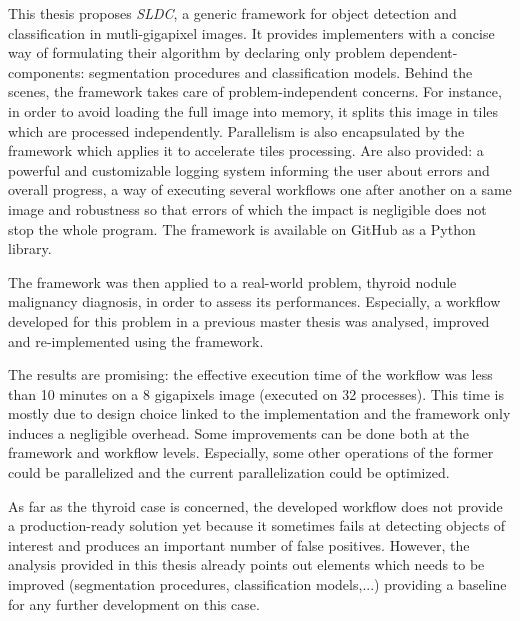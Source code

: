 This thesis proposes \textit{SLDC}, a generic framework for object detection and classification in mutli-gigapixel images. 
It provides implementers with a concise way of formulating their algorithm by declaring only problem dependent-components: segmentation procedures and classification models. Behind the scenes, the framework takes care of problem-independent concerns. For instance, in order to avoid loading the full image into memory, it splits this image in tiles which are processed independently. Parallelism is also encapsulated by the framework which applies it to accelerate tiles processing. Are also provided: a powerful and customizable logging system informing the user about errors and overall progress, a way of executing several workflows one after another on a same image and robustness so that errors of which the impact is negligible does not stop the whole program. The framework is available on GitHub as a Python library. 

The framework was then applied to a real-world problem, thyroid nodule malignancy diagnosis, in order to assess its performances. Especially, a workflow developed for this problem in a previous master thesis was analysed, improved and re-implemented using the framework. 

The results are promising: the effective execution time of the workflow was less than 10 minutes on a 8 gigapixels image (executed on 32 processes). This time is mostly due to design choice linked to the implementation and the framework only induces a negligible overhead. Some improvements can be done both at the framework and workflow levels. Especially, some other operations of the former could be parallelized and the current parallelization could be optimized.

As far as the thyroid case is concerned, the developed workflow does not provide a production-ready solution yet because it sometimes fails at detecting objects of interest and produces an important number of false positives. However, the analysis provided in this thesis already points out elements which needs to be improved (segmentation procedures, classification models,...) providing a baseline for any further development on this case.
